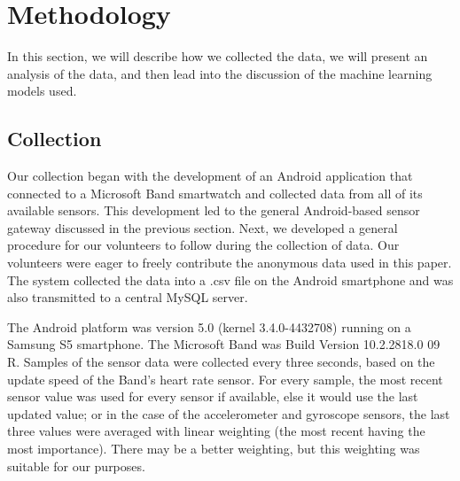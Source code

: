 \section{Methodology}

In this section, we will describe how we collected the data, we will present an analysis of the data, and then lead into the discussion of the machine learning models used.

\subsection{Collection}

Our collection began with the development of an Android application that connected to a Microsoft Band smartwatch and collected data from all of its available sensors. This development led to the general Android-based sensor gateway discussed in the previous section. Next, we developed a general procedure for our volunteers to follow during the collection of data. Our volunteers were eager to freely contribute the anonymous data used in this paper. The system collected the data into a .csv file on the Android smartphone and was also transmitted to a central MySQL server.

The Android platform was version 5.0 (kernel 3.4.0-4432708) running on a Samsung S5 smartphone. The Microsoft Band was Build Version 10.2.2818.0 09 R. Samples of the sensor data were collected every three seconds, based on the update speed of the Band's heart rate sensor. For every sample, the most recent sensor value was used for every sensor if available, else it would use the last updated value; or in the case of the accelerometer and gyroscope sensors, the last three values were averaged with linear weighting (the most recent having the most importance). There may be a better weighting, but this weighting was suitable for our purposes.

